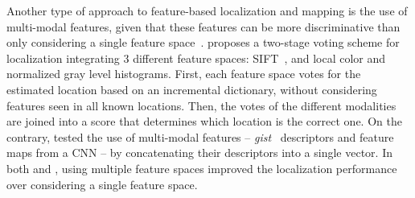 Another type of approach to feature-based localization and mapping is the use of multi-modal features, given that these features can be more discriminative than only considering a single feature space~\parencite{latif-et-al:2017:016}.
\cite{filliat:2007:364080} proposes a two-stage voting scheme for localization integrating 3 different feature spaces: SIFT~\parencite{original:sift}, and local color and normalized gray level histograms. First, each feature space votes for the estimated location based on an incremental dictionary, without considering features seen in all known locations. Then, the votes of the different modalities are joined into a score that determines which location is the correct one.
On the contrary, \cite{latif-et-al:2017:016} tested the use of multi-modal features -- \textit{gist}~\parencite{original:gist} descriptors and feature maps from a CNN -- by concatenating their descriptors into a single vector. 
In both \cite{filliat:2007:364080} and \cite{latif-et-al:2017:016}, using multiple feature spaces improved the localization performance over considering a single feature space.

